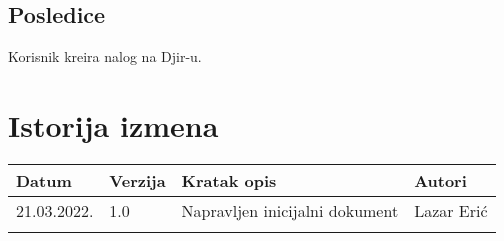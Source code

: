 \documentclass[12pt]{article}
\begin{document}
\subsection{Posledice}
Korisnik kreira nalog na Djir-u.

\section{Istorija izmena}
\begin{center}
\begin{tabular}{ | m{2cm} | m{1.5cm}| m{6cm} | m{5cm} | } 
\hline
Datum & Verzija & Kratak opis & Autori \\ 
\hline
 21.03.2022. & 1.0 & Napravljen inicijalni dokument & Lazar Erić\\ 
\hline
&&&\\ 
\hline
\end{tabular}
\end{center}
\end{document}
